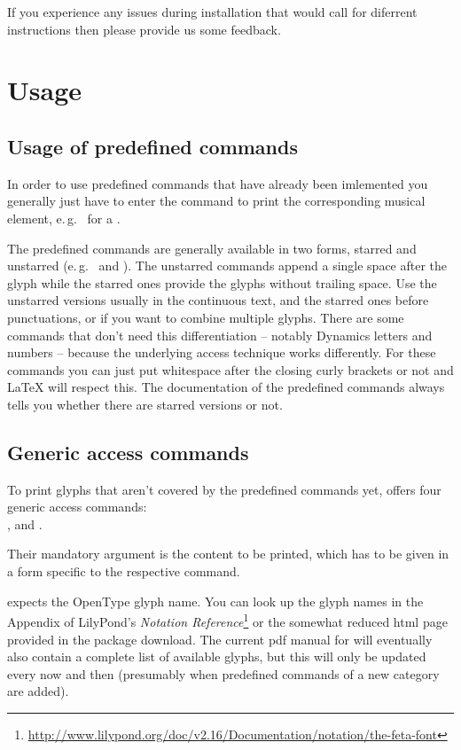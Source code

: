 \documentclass{OLLbook}
\begin{document}
If you experience any issues during installation that would call for diferrent instructions then please provide us some feedback.

\chapter{Usage}
\label{chap:usage}

\section{Usage of predefined commands}
\label{sec:usage_predefined_commands}
In order to use predefined commands that have already been imlemented you generally just have to enter the command to print the corresponding musical element, e.\,g.\  for a \lilyTimeC*.

The predefined commands are generally available in two forms, starred and unstarred (e.\,g.\  and ). 
The unstarred commands append a single space after the glyph while the starred ones provide the glyphs without trailing space. 
Use the unstarred versions usually in the continuous text, and the starred ones before punctuations, or if you want to combine multiple glyphs.
There are some commands that don't need this differentiation -- notably Dynamics letters and numbers -- because the underlying access technique works differently.
For these commands you can just put whitespace after the closing curly brackets or not and \LaTeX{} will respect this.
The documentation of the predefined commands always tells you whether there are starred versions or not.

\section{Generic access commands}
\label{sec:generic_access_commands}
To print \emmentaler glyphs that aren't covered by the predefined commands yet, \lilyglyphs offers four generic access commands:\\
,   and . 

Their mandatory argument is the content to be printed, which has to be given in a form specific to the respective command.

\medskip
{} expects the OpenType glyph name. 
You can look up the glyph names in the Appendix of LilyPond's \emph{Notation Reference}\footnote{\url{http://www.lilypond.org/doc/v2.16/Documentation/notation/the-feta-font}} or the somewhat reduced html page provided in the package download. 
The current pdf manual for \lilyglyphs will eventually also contain a complete list of available glyphs, but this will only be updated every now and then (presumably when predefined commands of a new category are added).
\end{document}
